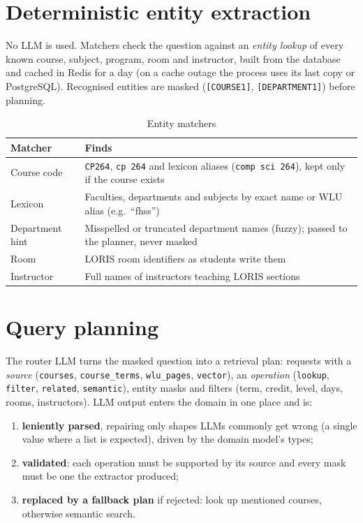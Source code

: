 \documentclass[11pt,letterpaper]{report}
\begin{document}
\section{Deterministic entity extraction}
No LLM is used. Matchers check the question against an \emph{entity lookup} of every known course,
subject, program, room and instructor, built from the database and cached in Redis for a day (on a
cache outage the process uses its last copy or PostgreSQL). Recognised entities are masked
(\texttt{[COURSE1]}, \texttt{[DEPARTMENT1]}) before planning.

\begin{table}[H]
\centering
\caption{Entity matchers}\label{tab:matchers}
\begin{tabularx}{\textwidth}{@{}P{4.2cm}L@{}}
\toprule
\textbf{Matcher} & \textbf{Finds} \\
\midrule
Course code & \texttt{CP264}, \texttt{cp 264} and lexicon aliases (\texttt{comp sci 264}), kept only if the course exists \\
Lexicon & Faculties, departments and subjects by exact name or WLU alias (e.g.\ ``fhss'') \\
Department hint & Misspelled or truncated department names (fuzzy); passed to the planner, never masked \\
Room & LORIS room identifiers as students write them \\
Instructor & Full names of instructors teaching LORIS sections \\
\bottomrule
\end{tabularx}
\end{table}

\section{Query planning}
The router LLM turns the masked question into a retrieval plan: requests with a \emph{source}
(\texttt{courses}, \texttt{course\_terms}, \texttt{wlu\_pages}, \texttt{vector}), an \emph{operation}
(\texttt{lookup}, \texttt{filter}, \texttt{related}, \texttt{semantic}), entity masks and filters (term,
credit, level, days, rooms, instructors). LLM output enters the domain in one place and is:
\begin{enumerate}
  \item \textbf{leniently parsed}, repairing only shapes LLMs commonly get wrong (a single value where a
        list is expected), driven by the domain model's types;
  \item \textbf{validated}: each operation must be supported by its source and every mask must be one the
        extractor produced;
  \item \textbf{replaced by a fallback plan} if rejected: look up mentioned courses, otherwise semantic search.
\end{enumerate}
\end{document}
